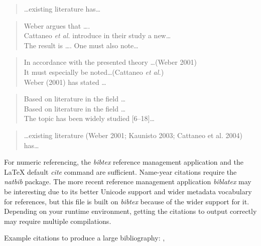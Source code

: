\documentclass[twoside,draftfooter]{tutthesis} %
\begin{document}
  \begin{quotation}
  \ldots existing literature \citep{Weber2001,Kaunisto2003,Cattaneo2004} has\ldots
  \end{quotation}
\else
  \begin{quotation}
  Weber argues that \ldots \cite{Weber2001}.\\
  Cattaneo \emph{et al.} introduce in their study \cite{Cattaneo2004} a new\ldots\\
  The result is \ldots \cite[s.~23]{Weber2001}. One must also note\ldots \cite[s.~33--36]{Weber2001}
  \end{quotation}

  \begin{quotation}
  In accordance with the presented theory \ldots (Weber 2001)\\
  It must especially be noted\ldots (Cattaneo \emph{et al.})\\
  Weber (2001) has stated \ldots
  \end{quotation}
    
  \begin{quotation}
  Based on literature in the field \cite{Weber2001,Cattaneo2004,Kaunisto2003}\ldots\\
  Based on literature in the field \cite{Weber2001}\cite{Cattaneo2004}\cite{Kaunisto2003}\ldots\\
  The topic has been widely studied [6--18]\ldots %
  \end{quotation}
    
  \begin{quotation}
  \ldots existing literature (Weber 2001; Kaunisto 2003; Cattaneo et al. 2004) has\ldots
  \end{quotation}
\fi

For numeric referencing, the \emph{bibtex} reference management application and the LaTeX default \emph{cite} command are sufficient.
Name-year citations require the \emph{natbib} package.
The more recent reference management application \emph{biblatex} may be interesting due to its better Unicode support and wider metadata vocabulary for references, but this file is built on \emph{bibtex} because of the wider support for it.
Depending on your runtime environment, getting the citations to output correctly may require multiple compilations.

Example citations to produce a large bibliography: \citep{Weber2001} \citep{Cattaneo2004} \citep{Kaunisto2003} \citep{Li2004} \citep{Ho-Ching2003} \citep{Puhakka2004} \citep{Nissinen2011en} \citep{Ohlstrom2005} \citep{OMAP4430} \citep{InjectionMolding2005} \citep{Raakakk2002} \citep{Intel2013} \citep{Davies2004} \citep{SFSISO1000A1} \citep{Keskinen2005en} \citep{Sahkoturvallisuuslaki1996} \citep{Pan2013} \citep{Tty2005en} \citep{ConstInorgComp2005}, \citep{Radionuklidit2003en} \citep{Kalkkihiekkatiilet2004} \citep{Miettinen2005en}
\end{document}
